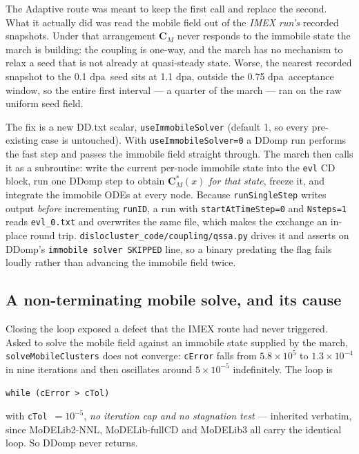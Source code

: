 \documentclass[11pt,a4paper]{article}
\newcommand{\code}[1]{\texttt{\small #1}}
\newcommand{\dpa}{\ensuremath{\mathrm{dpa}}}
\begin{document}
\noindent
The Adaptive route was meant to keep the first call and replace the second. What
it actually did was read the mobile field out of the \emph{IMEX run's}
recorded snapshots. Under that arrangement $\mathbf C_M$ never responds to the
immobile state the march is building: the coupling is one-way, and the march has
no mechanism to relax a seed that is not already at quasi-steady state. Worse,
the nearest recorded snapshot to the 0.1 \dpa\ seed sits at 1.1 \dpa, outside
the 0.75 \dpa\ acceptance window, so the entire first interval --- a quarter of
the march --- ran on the raw uniform seed field.

The fix is a new DD.txt scalar, \code{useImmobileSolver} (default 1, so every
pre-existing case is untouched). With \code{useImmobileSolver=0} a DDomp run
performs the fast step and passes the immobile field straight through. The march
then calls it as a subroutine: write the current per-node immobile state into
the \code{evl} CD block, run one DDomp step to obtain $\mathbf C_M^*(x)$
\emph{for that state}, freeze it, and integrate the immobile ODEs at every node.
Because \code{runSingleStep} writes output \emph{before} incrementing
\code{runID}, a run with \code{startAtTimeStep=0} and \code{Nsteps=1} reads
\code{evl\_0.txt} and overwrites the same file, which makes the exchange an
in-place round trip. \code{dislocluster\_code/coupling/qssa.py} drives it and asserts on
DDomp's \code{immobile solver SKIPPED} line, so a binary predating the flag
fails loudly rather than advancing the immobile field twice.

\subsection{A non-terminating mobile solve, and its cause}
\label{sec:mobilehang}

Closing the loop exposed a defect that the IMEX route had never triggered.
Asked to solve the mobile field against an immobile state supplied by the march,
\code{solveMobileClusters} does not converge: \code{cError} falls from
$5.8\times10^{5}$ to $1.3\times10^{-4}$ in nine iterations and then oscillates
around $5\times10^{-5}$ indefinitely. The loop is

\begin{center}\code{while (cError > cTol)}\end{center}

\noindent
with \code{cTol}~$=10^{-5}$, \emph{no iteration cap and no stagnation test} ---
inherited verbatim, since MoDELib2-NNL, MoDELib-fullCD and MoDELib3 all carry
the identical loop. So DDomp never returns.
\end{document}

